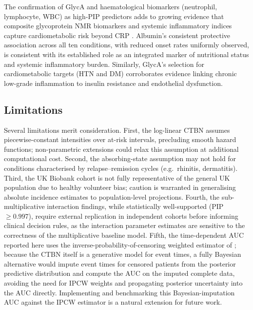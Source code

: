 \documentclass[12pt]{article}
\begin{document}
The confirmation of GlycA and haematological biomarkers (neutrophil, lymphocyte, 
WBC) as high-PIP predictors adds to growing evidence that composite 
glycoprotein NMR biomarkers and systemic inflammatory indices capture 
cardiometabolic risk beyond CRP \citep{cheng2024chronic}. Albumin's 
consistent protective association across all ten conditions, with reduced onset 
rates uniformly observed, is consistent with its established role as an 
integrated marker of nutritional status and systemic inflammatory burden. 
Similarly, GlycA's selection for cardiometabolic targets (HTN and DM) 
corroborates evidence linking chronic low-grade inflammation to insulin 
resistance and endothelial dysfunction.

\subsection{Limitations}

Several limitations merit consideration. First, the log-linear CTBN assumes piecewise-constant intensities over at-risk intervals, precluding smooth hazard 
functions; non-parametric extensions could relax this assumption at additional computational cost. Second, the absorbing-state assumption may not hold for 
conditions characterised by relapse--remission cycles (e.g.\ rhinitis, dermatitis). Third, the UK Biobank cohort is not fully representative of the general UK population due to healthy volunteer bias; 
caution is warranted in generalising absolute incidence estimates to population-level projections. Fourth, the sub-multiplicative interaction 
findings, while statistically well-supported (PIP $\geq 0.997$), require external replication in independent cohorts before informing clinical decision 
rules, as the interaction parameter estimates are sensitive to the correctness of the multiplicative baseline model. Fifth, the time-dependent AUC reported here uses the inverse-probability-of-censoring weighted estimator of \citet{BlancheCommengesJacqmin-Gadda2013}; because the CTBN itself is a generative model for event times, a fully Bayesian alternative would impute event times for censored patients from the posterior predictive distribution and compute the AUC on the imputed complete data, avoiding the need for IPCW weights and propagating posterior uncertainty into the AUC directly. Implementing and benchmarking this Bayesian-imputation AUC against the IPCW estimator is a natural extension for future work.
\end{document}
